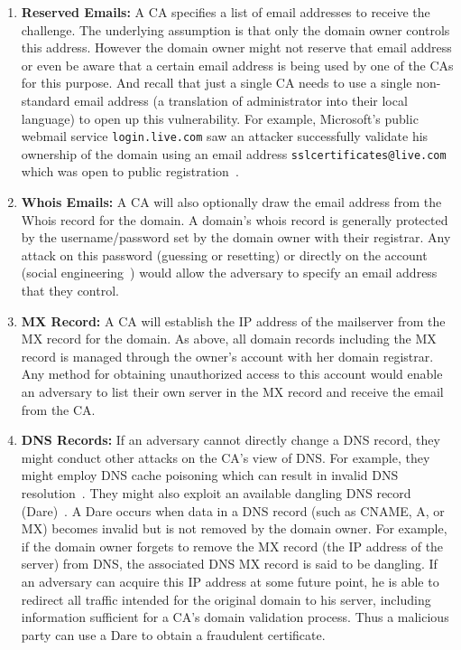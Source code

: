 \begin{enumerate}

\item \textbf{Reserved Emails:} A CA specifies a list of email addresses to receive the challenge. The underlying assumption is that only the domain owner controls this address. However the domain owner might not reserve that email address or even be aware that a certain email address is being used by one of the CAs for this purpose. And recall that just a single CA needs to use a single non-standard email address (\eg a translation of administrator into their local language) to open up this vulnerability. For example, Microsoft's public webmail service \texttt{login.live.com} saw an attacker successfully validate his ownership of the domain using an email address \texttt{sslcertificates@live.com} which was open to public registration~\cite{zusman2009criminal}.

\item \textbf{Whois Emails:} A CA will also optionally draw the email address from the Whois record for the domain. A domain's whois record is generally protected by the username/password set by the domain owner with their registrar. Any attack on this password (\eg guessing or resetting) or directly on the account (\eg social engineering~\cite{GoDaddyo45:online}) would allow the adversary to specify an email address that they control. 

\item \textbf{MX Record:} A CA will establish the IP address of the mailserver from the MX record for the domain. As above, all domain records including the MX record is managed through the owner's account with her domain registrar. Any method for obtaining unauthorized access to this account would enable an adversary to list their own server in the MX record and receive the email from the CA.

\item \textbf{DNS Records:} If an adversary cannot directly change a DNS record, they might conduct other attacks on the CA's view of DNS. For example, they might employ DNS cache poisoning which can result in invalid DNS resolution~\cite{son2010hitchhiker}. They might also exploit an available dangling DNS record (Dare)~\cite{liu2016all}.  A Dare occurs when data in a DNS record (such as CNAME, A, or MX) becomes invalid but is not removed by the domain owner. For example, if the domain owner forgets to remove the MX record (the IP address of the server) from DNS, the associated DNS MX record is said to be dangling. If an adversary can acquire this IP address at some future point, he is able to redirect all traffic intended for the original domain to his server, including information sufficient for a CA's domain validation process. Thus a malicious party can use a Dare to obtain a fraudulent certificate.


\end{enumerate}

